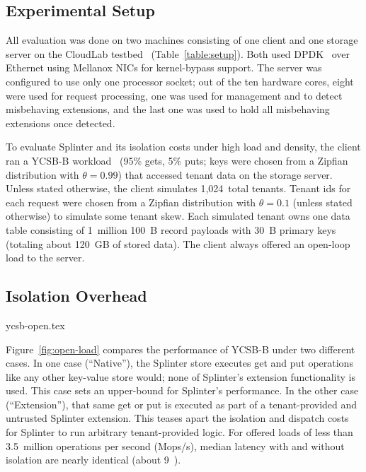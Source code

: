 \subsection{Experimental Setup}
All evaluation was done on two machines consisting of one client
and one storage server on the CloudLab
testbed~\cite{cloudlab} (Table~\ref{table:setup}). Both used
DPDK~\cite{dpdk} over Ethernet using Mellanox NICs for kernel-bypass
support. The server was configured to use only one processor socket; out
of the ten hardware cores, eight were used for request processing, one
was used for management and to detect misbehaving extensions, and the
last one was used to hold all misbehaving extensions once detected.

To evaluate Splinter and its isolation costs under high load and density, the
  client ran a YCSB-B workload~\cite{ycsb} (95\% gets, 5\% puts;
  keys were chosen from a Zipfian distribution with $\theta=0.99$) that
  accessed tenant data on the storage server.
Unless stated otherwise, the client simulates 1,024~total tenants.
Tenant ids for each request were chosen from a Zipfian distribution
  with $\theta=0.1$ (unless stated otherwise) to simulate some tenant skew.
Each simulated tenant owns one data table consisting of 1~million 100~B record
  payloads with 30~B primary keys (totaling about 120~GB of stored data).
The client always offered an open-loop load to the server.

\subsection{Isolation Overhead}
\label{sec:isolation-overhead}


 {ycsb-open.tex}

Figure~\ref{fig:open-load} compares the performance of YCSB-B under two
different cases.
In one case (``Native''), the Splinter store executes get and put operations like
  any other key-value store would; none of Splinter's extension functionality
  is used.
This case sets an upper-bound for Splinter's performance.
In the other case (``Extension''), that same get or put is executed as part of a
  tenant-provided and untrusted Splinter extension.
This teases apart the isolation and dispatch costs for Splinter to run
  arbitrary tenant-provided logic.
For offered loads of less than 3.5~million operations per second (Mops/s), median
  latency with and without isolation are nearly identical (about 9~\us).

